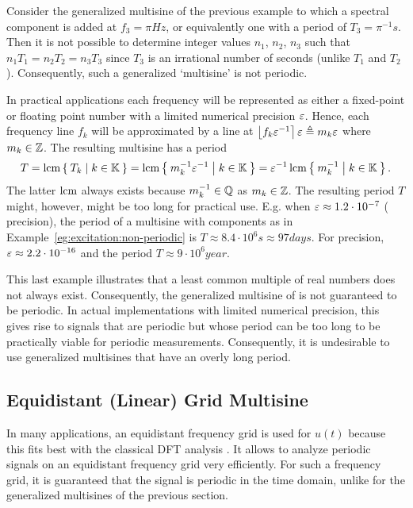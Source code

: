   \begin{example}\label{eg:excitation:non-periodic}
   Consider the generalized multisine of the previous example to which a spectral component is added at $f_3 = \pi \unit{Hz}$, or equivalently one with a period of $T_3 = \pi^{-1} \unit{s}$.
   Then it is not possible to determine integer values $n_1$, $n_2$, $n_3$ such that $n_1 T_1 = n_2 T_2 = n_3 T_3$ since $T_3$ is an irrational number of seconds (unlike $T_1$ and $T_2$).
   Consequently, such a generalized `multisine' is not periodic.
  \end{example}
  \begin{remark}
  In practical applications each frequency will be represented as either a fixed-point or floating point number with a limited numerical precision $\varepsilon$.
  Hence, each frequency line $f_k$ will be approximated by a line at $\left\lfloor f_k \varepsilon^{-1} \right\rceil \varepsilon \triangleq m_k \varepsilon$ where $m_k \in \mathbb{Z}$.
  The resulting multisine has a period 
  \begin{equation}
     T 
     = \operatorname{lcm} \Set{T_k |  k \in \mathbb{K}} 
     = \operatorname{lcm} \Set{m_k^{-1} \varepsilon^{-1} |  k \in \mathbb{K}}
     = \varepsilon^{-1} \operatorname{lcm} \Set{m_k^{-1} |  k \in \mathbb{K}}
     \text{.}
  \end{equation}
  The latter $\operatorname{lcm}$ always exists because $m_k^{-1}  \in \mathbb{Q}$ as $m_k \in \mathbb{Z}$.
  The resulting period $T$ might, however, might be too long for practical use.
  E.g. when $\varepsilon \approx 1.2\cdot 10^{-7}$ ( precision), the period of a multisine with components as in Example~\ref{eg:excitation:non-periodic} is $T \approx 8.4 \cdot 10^{6} \unit{s} \approx 97 \unit{days}$.
  For  precision, $\varepsilon \approx 2.2 \cdot 10^{-16}$ and the period $T \approx 9 \cdot 10^{6} \unit{year}$.
  \end{remark}

  This last example illustrates that a least common multiple of real numbers does not always exist.
  Consequently, the generalized multisine of  is not guaranteed to be periodic.
  In actual implementations with limited numerical precision, this gives rise to signals that are periodic but whose period can be too long to be practically viable for periodic measurements.
  Consequently, it is undesirable to use generalized multisines that have an overly long period.
  
\subsection{Equidistant (Linear) Grid Multisine}
  In many applications, an equidistant frequency grid is used for $u\left( t\right) $ because this fits best with the classical DFT analysis \citep{OppenheimDT,Mandal2007}. 
  It allows to analyze periodic signals on an equidistant frequency grid very efficiently.
  For such a frequency grid, it is guaranteed that the signal is periodic in the time domain, unlike for the generalized multisines of the previous section.
  
